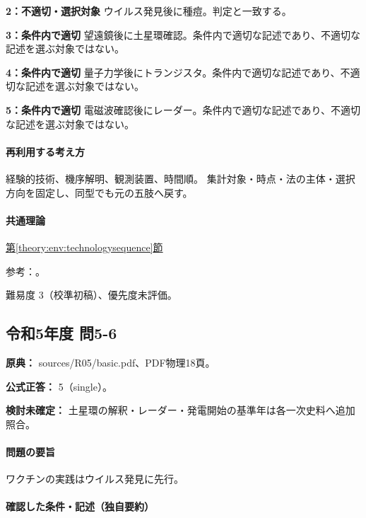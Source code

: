 \noindent\textbf{2：不適切・選択対象} ウイルス発見後に種痘。判定と一致する。\par

\noindent\textbf{3：条件内で適切} 望遠鏡後に土星環確認。条件内で適切な記述であり、不適切な記述を選ぶ対象ではない。\par

\noindent\textbf{4：条件内で適切} 量子力学後にトランジスタ。条件内で適切な記述であり、不適切な記述を選ぶ対象ではない。\par

\noindent\textbf{5：条件内で適切} 電磁波確認後にレーダー。条件内で適切な記述であり、不適切な記述を選ぶ対象ではない。\par

\paragraph{再利用する考え方} 経験的技術、機序解明、観測装置、時間順。 集計対象・時点・法の主体・選択方向を固定し、同型でも元の五肢へ戻す。

\paragraph{共通理論} \hyperref[theory:env:technologysequence]{第\ref*{theory:env:technologysequence}節}

\par 参考：\cite{env59_jenner}。

\par 難易度 3（校準初稿）、優先度未評価。

\subsection{令和5年度 問5-6}
\label{q:r05-reg-basic-5-6}

\noindent\textbf{原典：} sources/R05/basic.pdf、PDF物理18頁。

\textbf{公式正答：} 5（single）。

\par\textbf{検討未確定：} 土星環の解釈・レーダー・発電開始の基準年は各一次史料へ追加照合。

\paragraph{問題の要旨} ワクチンの実践はウイルス発見に先行。

\paragraph{確認した条件・記述（独自要約）}\mbox{}\par

